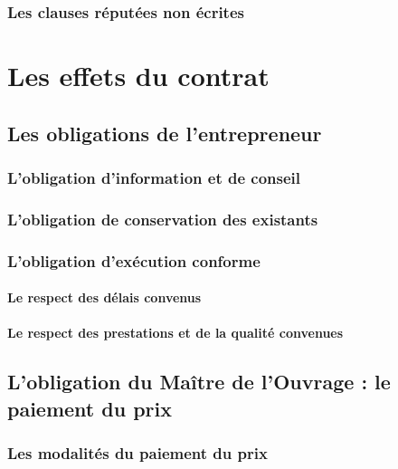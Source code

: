 			\subsubsection{Les clauses réputées non écrites}
	
	\section{Les effets du contrat}
	
		\subsection{Les obligations de l'entrepreneur}
		
			\subsubsection{L'obligation d'information et de conseil}
			
			\subsubsection{L'obligation de conservation des existants}
			
			\subsubsection{L'obligation d'exécution conforme}
			
				\paragraph{Le respect des délais convenus}
				
				\paragraph{Le respect des prestations et de la qualité convenues}
		
		\subsection[L'obligation du Maître de l'Ouvrage]{L'obligation du Maître de l'Ouvrage : le paiement du prix}
		
			\subsubsection{Les modalités du paiement du prix}
			
